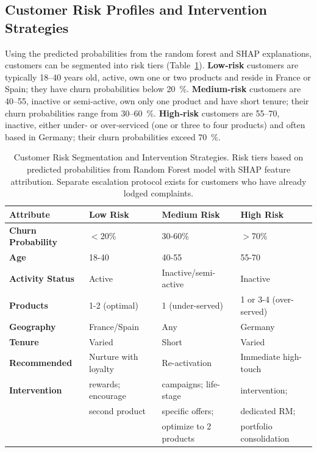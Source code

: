 \documentclass[12pt]{article}
\begin{document}
\subsection{Customer Risk Profiles and Intervention Strategies}
Using the predicted probabilities from the random forest and SHAP explanations, customers can be segmented into risk tiers (Table~\ref{tab:risk_profiles}).  \textbf{Low‑risk} customers are typically 18–40 years old, active, own one or two products and reside in France or Spain; they have churn probabilities below 20~\%.  \textbf{Medium‑risk} customers are 40–55, inactive or semi‑active, own only one product and have short tenure; their churn probabilities range from 30–60~\%.  \textbf{High‑risk} customers are 55–70, inactive, either under‑ or over‑serviced (one or three to four products) and often based in Germany; their churn probabilities exceed 70~\%.

\begin{table}[H]
\centering
\caption{Customer Risk Segmentation and Intervention Strategies. Risk tiers based on predicted probabilities from Random Forest model with SHAP feature attribution. Separate escalation protocol exists for customers who have already lodged complaints.}
\label{tab:risk_profiles}
\begin{tabular}{p{2.5cm}p{3.5cm}p{3.5cm}p{3.5cm}}
\toprule
\textbf{Attribute} & \textbf{Low Risk} & \textbf{Medium Risk} & \textbf{High Risk} \\
\midrule
\textbf{Churn Probability} & $<$20\% & 30-60\% & $>$70\% \\
\textbf{Age} & 18-40 & 40-55 & 55-70 \\
\textbf{Activity Status} & Active & Inactive/semi-active & Inactive \\
\textbf{Products} & 1-2 (optimal) & 1 (under-served) & 1 or 3-4 (over-served) \\
\textbf{Geography} & France/Spain & Any & Germany \\
\textbf{Tenure} & Varied & Short & Varied \\
\midrule
\textbf{Recommended} & Nurture with loyalty & Re-activation & Immediate high-touch \\
\textbf{Intervention} & rewards; encourage & campaigns; life-stage & intervention; \\
& second product & specific offers; & dedicated RM; \\
& & optimize to 2 products & portfolio consolidation \\
\bottomrule
\end{tabular}
\end{table}
\end{document}

